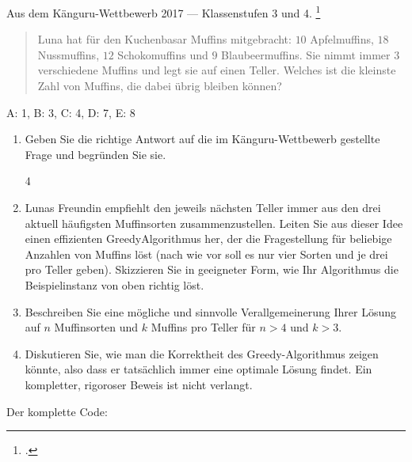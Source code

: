 \documentclass{bschlangaul-aufgabe}
\begin{document}

Aus dem Känguru-Wettbewerb 2017 — Klassenstufen 3 und 4.
\footcite[Seite 5]{examen:66115:2019:03}

\bigskip

\begin{quote}
Luna hat für den Kuchenbasar Muffins mitgebracht: $10$ Apfelmuffins,
$18$ Nussmuffins, $12$ Schokomuffins und $9$ Blaubeermuffins. Sie nimmt
immer $3$ verschiedene Muffins und legt sie auf einen Teller. Welches
ist die kleinste Zahl von Muffins, die dabei übrig bleiben können?
\end{quote}

\begin{center}
A: 1, B: 3, C: 4, D: 7, E: 8
\end{center}

\begin{enumerate}
\item Geben Sie die richtige Antwort auf die im Känguru-Wettbewerb
gestellte Frage und begründen Sie sie.

\begin{bAntwort}
4
\end{bAntwort}

\item Lunas Freundin empfiehlt den jeweils nächsten Teller immer aus den
drei aktuell häufigsten Muffinsorten zusammenzustellen. Leiten Sie aus
dieser Idee einen effizienten GreedyAlgorithmus her, der die
Fragestellung für beliebige Anzahlen von Muffins löst (nach wie vor soll
es nur vier Sorten und je drei pro Teller geben). Skizzieren Sie in
geeigneter Form, wie Ihr Algorithmus die Beispielinstanz von oben
richtig löst.

\begin{bAntwort}
\end{bAntwort}

\item Beschreiben Sie eine mögliche und sinnvolle Verallgemeinerung
Ihrer Lösung auf $n$ Muffinsorten und $k$ Muffins pro Teller für $n > 4$
und $k > 3$.

\begin{bAntwort}
\end{bAntwort}

\item Diskutieren Sie, wie man die Korrektheit des Greedy-Algorithmus
zeigen könnte, also dass er tatsächlich immer eine optimale Lösung
findet. Ein kompletter, rigoroser Beweis ist nicht verlangt.
\end{enumerate}

\begin{bAdditum}

Der komplette Code:

\end{bAdditum}
\end{document}
